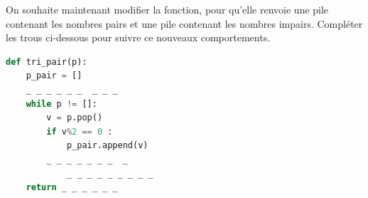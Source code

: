 \begin{Exercise}[title={Pile de nombres pairs}]
\Question On souhaite maintenant modifier la fonction, pour qu'elle renvoie une pile contenant les nombres pairs et une pile contenant les nombres impairs. Compléter les trous ci-dessous pour suivre ce nouveaux comportements.\\
\begin{lstlisting}[language=Python]
def tri_pair(p):
    p_pair = []
    _ _ _ _ _ _  _ _ _ 
    while p != []:
        v = p.pop()
        if v%2 == 0 :
            p_pair.append(v)
        _ _ _ _ _ _ _  _
            _ _ _ _ _ _ _ _ _ 
    return _ _ _ _ _ _ 
\end{lstlisting}


\end{Exercise}